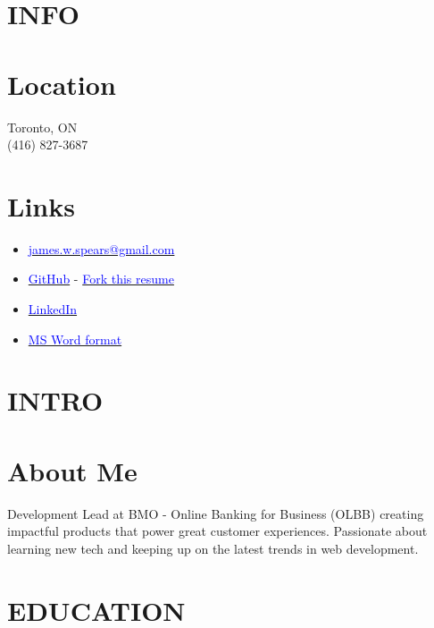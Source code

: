 \documentclass[margin]{res}
\begin{document}
\name{\textcolor{NavyBlue}{James Spears} \textcolor{black}{\bf Development Lead - Commercial Banking - BMO} }

\begin{resume}

	\section{\textcolor{NavyBlue}{INFO}}

	\normalsize{\section{Location}}
	{Toronto, ON \\ (416) 827-3687}

	\normalsize{\section{Links}}
	\begin{itemize}
		\item \href{mailto:james.w.spears@gmail.com}{\textcolor{blue}{james.w.spears@gmail.com}}
		\item \href{https://github.com/james-spears}{\textcolor{blue}{GitHub}} - \href{https://github.com/james-spears/resume}{\textcolor{blue}{Fork this resume}}
		\item \href{https://www.linkedin.com/in/james-spears-50834b8a/}{\textcolor{blue}{LinkedIn}}
		\item \href{https://s3.amazonaws.com/james-spears.com/resume.docx}{\textcolor{blue}{MS Word format}}
	\end{itemize}

	\section{\textcolor{NavyBlue}{INTRO}}

	\normalsize{\section{About Me}}
	Development Lead at BMO - Online Banking for Business (OLBB) creating impactful products that power great customer experiences.
	Passionate about learning new tech and keeping up on the latest trends in web development.
	\section{\textcolor{NavyBlue}{EDUCATION}}


\end{resume}
\end{document}
